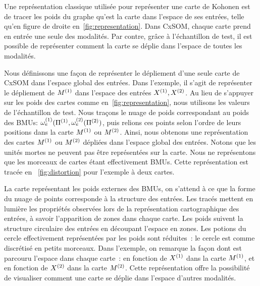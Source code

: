 \documentclass[../main]{subfiles}
\begin{document}
Une représentation classique utilisée pour représenter une carte de Kohonen est de tracer les poids du graphe qu'est la carte dans l'espace de ses entrées, telle qu'en figure de droite en~\ref{fig:representation}. Dans CxSOM, chaque carte prend en entrée une seule des modalités. Par contre, grâce à l'échantillon de test, il est possible de représenter comment la carte se déplie dans l'espace de toutes les modalités.

Nous définissons une façon de représenter le dépliement d'une seule carte de CxSOM dans l'espace global des entrées. Dans l'exemple, il s'agit de représenter le dépliement de $M^{({1})}$ dans l'espace des entrées $X^{({1})},X^{({2})}$.
Au lieu de s'appuyer sur les poids des cartes comme en~\ref{fig:representation}, nous utilisons les valeurs de l'échantillon de test. Nous traçons le nuage de poids correspondant au poids des BMUs: $\omega_e^{({1})}(\Pi^{({1})},\omega_e^{({2})}(\Pi^{({2})})$, puis relions ces points selon l'ordre de leurs positions dans la carte $M^{({1})}$ ou $M^{({2})}$. Ainsi, nous obtenons une représentation des cartes $M^{({1})}$ ou $M^{({2})}$ dépliées dans l'espace global des entrées. 
Notons que les unités mortes ne peuvent pas être représentées sur la carte. Nous ne représentons que les morceaux de cartes étant effectivement BMUs. 
Cette représentation est tracée en ~\ref{fig:distortion} pour l'exemple à deux cartes.

La carte représentant les poids externes des BMUs, on s'attend à ce que la forme du nuage de points corresponde à la structure des entrées.
Les tracés mettent en lumière les propriétés observées lors de la représentation cartographique des entrées, à savoir l'apparition de zones dans chaque carte. Les poids suivent la structure circulaire des entrées en découpant l'espace en zones. Les potions du cercle effectivement représentées par les poids sont réduites~: le cercle est comme discrétisé en petits morceaux.
Dans l'exemple, on remarque la façon dont est parcouru l'espace dans chaque carte~: en fonction de $X^{({1})}$ dans la carte $M^{({1})}$, et en fonction de $X^{({2})}$ dans la carte $M^{({2})}$. 
Cette représentation offre la possibilité  de visualiser comment une carte se déplie dans l'espace d'autres modalités.
\end{document}
